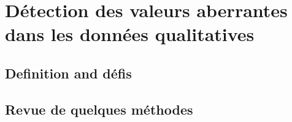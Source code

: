 \section{Détection des valeurs aberrantes dans les données qualitatives}
%
\subsection{Definition and défis}
%
\subsection{Revue de quelques méthodes}
